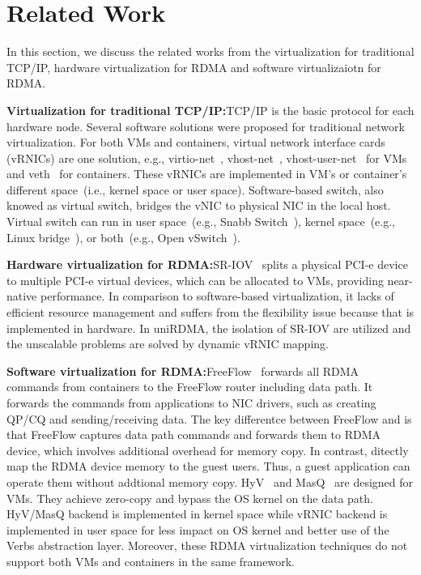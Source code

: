 \section{Related Work} \label{relatedwork}

In this section, we discuss the related works from the virtualization for traditional TCP/IP, hardware virtualization for RDMA and software virtualizaiotn for RDMA.

\textbf{Virtualization for traditional TCP/IP:}\quad TCP/IP is the basic protocol for each hardware node. Several software solutions were proposed for traditional network virtualization. For both VMs and containers, virtual network interface cards (vRNICs) are one solution, e.g., virtio-net~\cite{virtio-russell2008}, vhost-net~\cite{vhost-net},  vhost-user-net~\cite{vhost-user-net} for VMs and veth~\cite{veth} for containers. These vRNICs are implemented in VM's or container's different space~(i.e., kernel space or user space). Software-based switch, also knowed as virtual switch, bridges the vNIC to physical NIC in the local host. Virtual switch can run in user space~(e.g., Snabb Switch~\cite{snabb}), kernel space~(e.g., Linux bridge~\cite{linux-bridge}), or both~(e.g., Open vSwitch~\cite{ovs-2015}). 

\textbf{Hardware virtualization for RDMA:}\quad SR-IOV~\cite{sr-iov} splits a physical PCI-e device to multiple PCI-e virtual devices, which can be allocated to VMs, providing near-native performance. In comparison to software-based virtualization, it lacks of efficient resource management and suffers from the flexibility issue because that is implemented in hardware. In uniRDMA, the isolation of SR-IOV are utilized and the unscalable problems are solved by dynamic vRNIC mapping. 

\textbf{Software virtualization for RDMA:}\quad FreeFlow~\cite{kim2019freeflow} forwards all RDMA commands from containers to the FreeFlow router including data path. It forwards the commands from applications to NIC drivers, such as creating QP/CQ and sending/receiving data. The key differentce between FreeFlow and \sys is that FreeFlow captures data path commands and forwards them to RDMA device, which involves additional overhead for memory copy. In contrast, \sys ditectly map the RDMA device memory to the guest users. Thus, a guest application can operate them without addtional memory copy. HyV~\cite{pfefferle2015hybrid} and MasQ~\cite{he2020masq} are designed for VMs. They achieve zero-copy and bypass the OS kernel on the data path. HyV/MasQ backend is implemented in kernel space while \sys vRNIC backend is implemented in user space for less impact on OS kernel and better use of the Verbs abstraction layer. Moreover, these RDMA virtualization techniques do not support both VMs and containers in the same framework. 